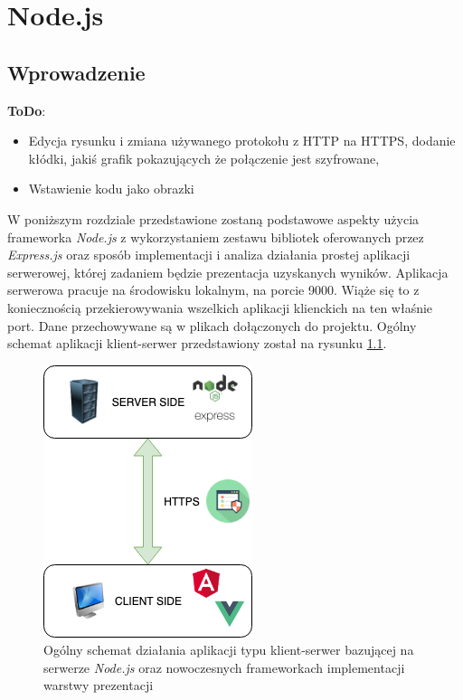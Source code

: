 \chapter{Node.js}

\section{Wprowadzenie}

\textbf{ToDo}: 

\begin{itemize}
	\item Edycja rysunku i zmiana używanego protokołu z HTTP na HTTPS, dodanie kłódki, jakiś grafik pokazujących że połączenie jest szyfrowane,
	\item Wstawienie kodu jako obrazki
\end{itemize}                        

W poniższym rozdziale przedstawione zostaną podstawowe aspekty użycia frameworka \textit{Node.js} z wykorzystaniem zestawu bibliotek oferowanych przez \textit{Express.js} oraz sposób implementacji i analiza działania prostej aplikacji serwerowej, której zadaniem będzie prezentacja uzyskanych wyników. Aplikacja serwerowa pracuje na środowisku lokalnym, na porcie 9000. Wiąże się to z koniecznością przekierowywania wszelkich aplikacji klienckich na ten właśnie port. Dane przechowywane są w plikach dołączonych do projektu. Ogólny schemat aplikacji klient-serwer przedstawiony został na rysunku \ref{Rys:nodejs}.

\begin{figure}[h]
	\centering\includegraphics[scale=0.8]{images/nodejs/app_working.png}
	\caption{Ogólny schemat działania aplikacji typu klient-serwer bazującej na serwerze \textit{Node.js} oraz nowoczesnych frameworkach implementacji warstwy prezentacji}
	\label{Rys:nodejs}
\end{figure}

